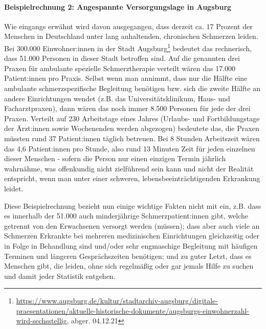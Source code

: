 \documentclass[
  twoside,
  parskip=half-,
]{scrreprt}
\begin{document}
\paragraph{Beispielrechnung 2: Angespannte Versorgungslage in Augsburg}
Wie eingangs erwähnt wird davon ausgegangen, dass derzeit ca. 17 Prozent der Menschen in Deutschland unter lang anhaltenden, chronischen Schmerzen leiden. Bei 300.000 Einwohner:innen in der Stadt Augsburg\footnote{\url{https://www.augsburg.de/kultur/stadtarchiv-augsburg/digitale-praesentationen/aktuelle-historische-dokumente/augsburgs-einwohnerzahl-wird-sechsstellig},  abger. 04.12.21} bedeutet das rechnerisch, dass 51.000 Personen in dieser Stadt betroffen sind. Auf die genannten drei Praxen für ambulante spezielle Schmerztherapie verteilt wären das 17.000 Patient:innen pro Praxis. Selbst wenn man annimmt, dass nur die Hälfte eine ambulante schmerzspezifische Begleitung benötigen bzw. sich die zweite Hälfte an andere Einrichtungen wendet (z.B. das Universitätsklinikum, Haus- und Facharztpraxen), dann wären das noch immer 8.500 Personen für jede der drei Praxen. Verteilt auf 230 Arbeitstage eines Jahres (Urlaubs- und Fortbildungstage der Ärzt:innen sowie Wochenenden werden abgezogen) bedeutete das, die Praxen müssten rund 37 Patient:innen täglich betreuen. Bei 8 Stunden Arbeitszeit wären das 4,6 Patient:innen pro Stunde, also rund 13 Minuten Zeit für jeden einzelnen dieser Menschen - sofern die Person nur einen einzigen Termin jährlich wahrnähme, was offenkundig nicht zielführend sein kann und nicht der Realität entspricht, wenn man unter einer schweren, lebensbeeinträchtigenden Erkrankung leidet. 

Diese Beispielrechnung bezieht nun einige wichtige Fakten nicht mit ein, z.B. dass es innerhalb der 51.000 auch minderjährige Schmerzpatient:innen gibt, welche getrennt von den Erwachsenen versorgt werden (müssen); dass aber auch viele an Schmerzen Erkrankte bei mehreren medizinischen Einrichtungen gleichzeitig oder in Folge in Behandlung sind und/oder sehr engmaschige Begleitung mit häufigen Terminen und längeren Gesprächszeiten benötigen; und zu guter Letzt, dass es Menschen gibt, die  leiden, ohne sich regelmäßig oder gar jemals Hilfe zu suchen und damit jeder Statistik entgehen.
\end{document}
